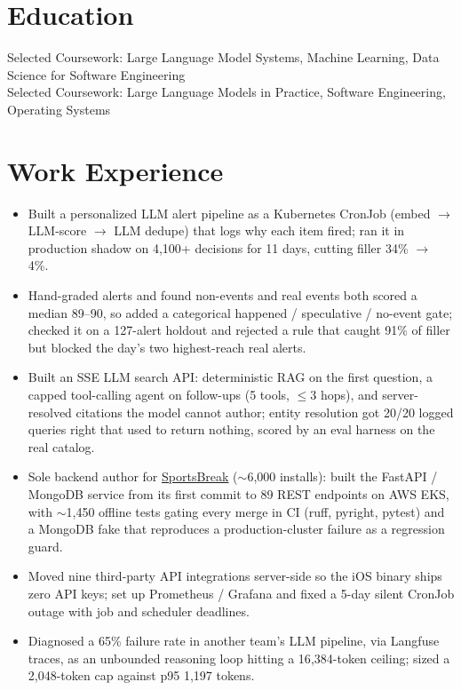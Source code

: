 \documentclass[11pt, letterpaper]{article}
\begin{document}

\section{Education}
Selected Coursework: Large Language Model Systems, Machine Learning, Data Science for Software Engineering\\[1pt]
Selected Coursework: Large Language Models in Practice, Software Engineering, Operating Systems

\section{Work Experience}
\begin{itemize}
  \item Built a personalized LLM alert pipeline as a Kubernetes CronJob (embed $\to$ LLM-score $\to$ LLM dedupe) that logs why each item fired; ran it in production shadow on 4{,}100+ decisions for 11 days, cutting filler 34\% $\to$ 4\%.
  \item Hand-graded alerts and found non-events and real events both scored a median 89--90, so added a categorical happened / speculative / no-event gate; checked it on a 127-alert holdout and rejected a rule that caught 91\% of filler but blocked the day's two highest-reach real alerts.
  \item Built an SSE LLM search API: deterministic RAG on the first question, a capped tool-calling agent on follow-ups (5 tools, $\le$3 hops), and server-resolved citations the model cannot author; entity resolution got 20/20 logged queries right that used to return nothing, scored by an eval harness on the real catalog.
  \item Sole backend author for \href{https://apps.apple.com/app/id6762649287}{SportsBreak} ($\sim$6{,}000 installs): built the FastAPI / MongoDB service from its first commit to 89 REST endpoints on AWS EKS, with $\sim$1{,}450 offline tests gating every merge in CI (ruff, pyright, pytest) and a MongoDB fake that reproduces a production-cluster failure as a regression guard.
  \item Moved nine third-party API integrations server-side so the iOS binary ships zero API keys; set up Prometheus / Grafana and fixed a 5-day silent CronJob outage with job and scheduler deadlines.
  \item Diagnosed a 65\% failure rate in another team's LLM pipeline, via Langfuse traces, as an unbounded reasoning loop hitting a 16{,}384-token ceiling; sized a 2{,}048-token cap against p95 1{,}197 tokens.
\end{itemize}
\end{document}
